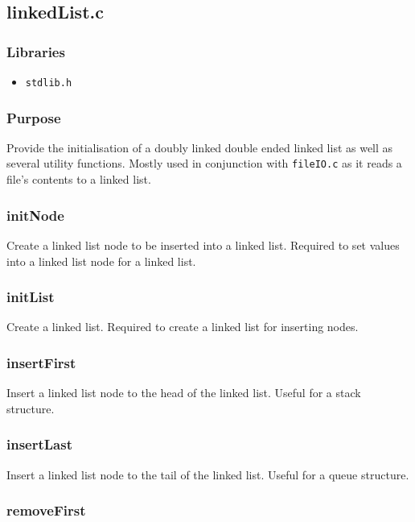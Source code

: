 \documentclass[a4paper, 12pt, titlepage]{article}
\newcommand{\code}[1]{\small\texttt{#1}\normalsize}
\begin{document}
\pagebreak
\subsection{linkedList.c}
\subsubsection{Libraries}

\begin{itemize}[label={--}, noitemsep]
    \item \code{stdlib.h}
\end{itemize}

\subsubsection{Purpose}

Provide the initialisation of a doubly linked double ended linked list as
well as several utility functions. Mostly used in conjunction with
\code{fileIO.c} as it reads a file's contents to a linked list.

\subsubsection{initNode}

Create a linked list node to be inserted into a linked list. Required to
set values into a linked list node for a linked list.

\subsubsection{initList}

Create a linked list. Required to create a linked list for inserting nodes.

\subsubsection{insertFirst}

Insert a linked list node to the head of the linked list. Useful for a
stack structure.

\subsubsection{insertLast}

Insert a linked list node to the tail of the linked list. Useful for a
queue structure.

\subsubsection{removeFirst}
\end{document}
